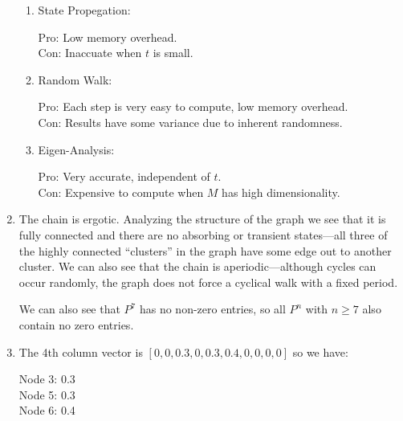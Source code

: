 \documentclass[12pt]{article}
\begin{document}
\begin{enumerate}
\begin{enumerate}
			\item State Propegation:

				Pro: Low memory overhead.\\
				Con: Inaccuate when $t$ is small.

			\item Random Walk:

				Pro: Each step is very easy to compute, low memory overhead.\\
				Con: Results have some variance due to inherent randomness.

			\item Eigen-Analysis:

				Pro: Very accurate, independent of $t$.\\
				Con: Expensive to compute when $M$ has high dimensionality.
		\end{enumerate}

	\item
		The chain is ergotic. Analyzing the structure of the graph we see that it is fully connected and there are no absorbing or transient states---all three of the highly
		connected ``clusters'' in the graph have some edge out to another cluster. We can also see that the chain is aperiodic---although cycles can occur randomly, the graph
		does not force a cyclical walk with a fixed period.

		We can also see that $P^7$ has no non-zero entries, so all $P^n$ with $n \geq 7$ also contain no zero entries.
	
	\item The 4th column vector is $[0,0,0.3,0,0.3,0.4,0,0,0,0]$ so we have:

		Node 3: 0.3\\
		Node 5: 0.3\\
		Node 6: 0.4\\
\end{enumerate}
\end{document}
